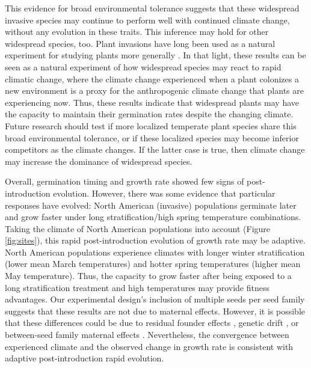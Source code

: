 \documentclass[11pt]{article}\usepackage[]{graphicx}\usepackage[]{color}
\begin{document}
	This evidence for broad environmental tolerance suggests that these widespread invasive species may continue to perform well with continued climate change, without any evolution in these traits. This inference may hold for other widespread species, too.  Plant invasions have long been used as a natural experiment for studying plants more generally \parencite[e.g., ][]{Yoshida2007}. In that light, these results can be seen as a natural experiment of how widespread species may react to rapid climatic change, where the climate change experienced when a plant colonizes a new environment is a proxy for the anthropogenic climate change that plants are experiencing now. Thus, these results indicate that widespread plants may have the capacity to maintain their germination rates despite the changing climate. Future research should test if more localized temperate plant species share this broad environmental tolerance, or if these localized species may become inferior competitors as the climate changes. If the latter case is true, then climate change may increase the dominance of widespread species. %

	Overall, germination timing and growth rate showed few signs of post-introduction evolution. However, there was some evidence that particular responses have evolved: North American (invasive) populations germinate later and grow faster under long stratification/high spring temperature combinations. Taking the climate of North American populations into account (Figure \ref{fig:sites}), this rapid post-introduction evolution of growth rate may be adaptive. North American populations experience climates with longer winter stratification  (lower mean March temperatures) and hotter spring temperatures (higher mean May temperature). Thus, the capacity to grow faster after being exposed to a long stratification treatment and high temperatures may provide fitness advantages. Our experimental design's inclusion of multiple seeds per seed family suggests that these results are not due to maternal effects. However, it is  possible that these differences could be due to residual founder effects \parencite{Shirk2014}, genetic drift \parencite{Eckert1996}, or between-seed family maternal effects \parencite{Galloway2005}. Nevertheless, the convergence between experienced climate and the observed change in growth rate is consistent with adaptive post-introduction rapid evolution. 
	
\end{document}
